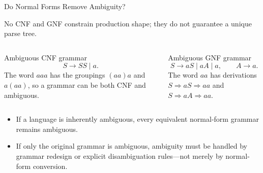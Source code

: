 \documentclass[10pt]{beamer}
\begin{document}
\begin{frame}{Do Normal Forms Remove Ambiguity?}
  \small
  \begin{alertblock}{No}
    CNF and GNF constrain production shape; they do not guarantee a unique
    parse tree.
  \end{alertblock}
  \pause
  \begin{columns}[T]
    \begin{block}{Ambiguous CNF grammar}
      \[
        S\to SS\mid a.
      \]
      The word $aaa$ has the groupings $(aa)a$ and $a(aa)$, so a grammar can
      be both CNF and ambiguous.
    \end{block}
    \begin{block}{Ambiguous GNF grammar}
      \[
        S\to aS\mid aA\mid a,\qquad A\to a.
      \]
      The word $aa$ has derivations $S\Rightarrow aS\Rightarrow aa$ and
      $S\Rightarrow aA\Rightarrow aa$.
    \end{block}
  \end{columns}
  \begin{itemize}
    \item If a language is inherently ambiguous, every equivalent normal-form
      grammar remains ambiguous.
    \item If only the original grammar is ambiguous, ambiguity must be handled
      by grammar redesign or explicit disambiguation rules—not merely by
      normal-form conversion.
  \end{itemize}
\end{frame}
\end{document}
